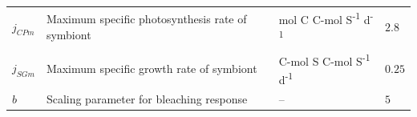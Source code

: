 \documentclass[]{elsarticle} %
\begin{document}
\begin{longtable}[]{@{}llll@{}}
\begin{minipage}[t]{0.09\columnwidth}\raggedright\strut
\(j_{CPm}\)\strut
\end{minipage} & \begin{minipage}[t]{0.44\columnwidth}\raggedright\strut
Maximum specific photosynthesis rate of symbiont\strut
\end{minipage} & \begin{minipage}[t]{0.24\columnwidth}\raggedright\strut
mol C C-mol S\textsuperscript{-1} d\textsuperscript{-1}\strut
\end{minipage} & \begin{minipage}[t]{0.12\columnwidth}\raggedright\strut
\(2.8\)\strut
\end{minipage}\tabularnewline
\begin{minipage}[t]{0.09\columnwidth}\raggedright\strut
\(j_{SGm}\)\strut
\end{minipage} & \begin{minipage}[t]{0.44\columnwidth}\raggedright\strut
Maximum specific growth rate of symbiont\strut
\end{minipage} & \begin{minipage}[t]{0.24\columnwidth}\raggedright\strut
C-mol S C-mol S\textsuperscript{-1} d\textsuperscript{-1}\strut
\end{minipage} & \begin{minipage}[t]{0.12\columnwidth}\raggedright\strut
\(0.25\)\strut
\end{minipage}\tabularnewline
\begin{minipage}[t]{0.09\columnwidth}\raggedright\strut
\(b\)\strut
\end{minipage} & \begin{minipage}[t]{0.44\columnwidth}\raggedright\strut
Scaling parameter for bleaching response\strut
\end{minipage} & \begin{minipage}[t]{0.24\columnwidth}\raggedright\strut
--\strut
\end{minipage} & \begin{minipage}[t]{0.12\columnwidth}\raggedright\strut
\(5\)\strut
\end{minipage}\tabularnewline
\bottomrule
\end{longtable}
\end{document}
